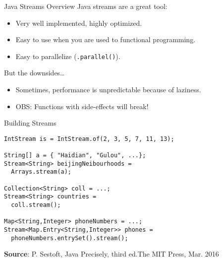 \documentclass{beamer}
\begin{document}
\begin{frame}{Java Streams Overview}
  Java streams are a great tool:
  \begin{itemize}
  \item Very well implemented, highly optimized.
  \item Easy to use when you are used to functional programming.
  \item Easy to parallelize (\lstinline{.parallel()}).
  \end{itemize}

  \pause{} But the downsides\dots{}
  \begin{itemize}
  \item Sometimes, performance is unpredictable because of laziness.
  \item OBS: Functions with side-effects will break!
  \end{itemize}
\end{frame}

\begin{frame}[fragile]{Building Streams}
\begin{lstlisting}
IntStream is = IntStream.of(2, 3, 5, 7, 11, 13);

String[] a = { "Haidian", "Gulou", ...};
Stream<String> beijingNeibourhoods =
  Arrays.stream(a);

Collection<String> coll = ...;
Stream<String> countries =
  coll.stream();

Map<String,Integer> phoneNumbers = ...;
Stream<Map.Entry<String,Integer>> phones =
  phoneNumbers.entrySet().stream();
\end{lstlisting}

\footnotesize{\textbf{Source}: P. Sestoft, Java Precisely, third ed.The MIT Press, Mar. 2016}
\end{frame}
\end{document}
